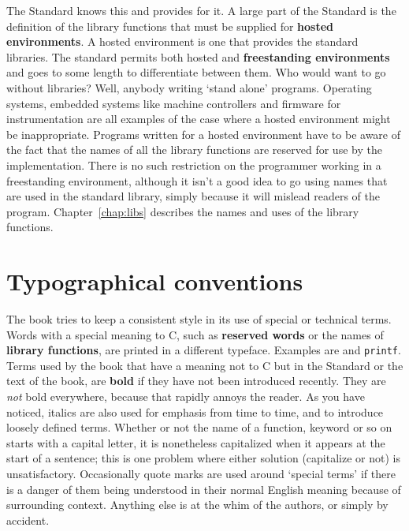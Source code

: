   The Standard knows this and provides for it. A large part of the Standard
   is the definition of the library functions that must be supplied for
   \textbf{hosted environments}. A hosted environment is one that provides
   the standard libraries. The standard permits both hosted and
   \textbf{freestanding environments} and goes to some length to
   differentiate between them. Who would want to go without libraries? Well,
   anybody writing `stand alone' programs. Operating systems, embedded
   systems like machine controllers and firmware for instrumentation are all
   examples of the case where a hosted environment might be inappropriate.
   Programs written for a hosted environment have to be aware of the fact that
   the names of all the library functions are reserved for use by the
   implementation. There is no such restriction on the programmer working in a
   freestanding environment, although it isn't a good idea to go using names
   that are used in the standard library, simply because it will mislead
   readers of the program.
   Chapter~\ref{chap:libs} describes the names and uses
   of the library functions.


 
        \section*{Typographical conventions}
        

  

  The book tries to keep a consistent style in its use of special or
   technical terms. Words with a special meaning to C, such as
   \textbf{reserved words} or the names of \textbf{library functions}, are
   printed in a different typeface. Examples are \kint{} and
   \texttt{printf}. Terms used by the book that have a meaning not to C
   but in the Standard or the text of the book, are \textbf{bold} if they
   have not been introduced recently. They are \textit{not} bold everywhere,
   because that rapidly annoys the reader. As you have noticed, italics are
   also used for emphasis from time to time, and to introduce loosely defined
   terms. Whether or not the name of a function, keyword or so on starts with
   a capital letter, it is nonetheless capitalized when it appears at the
   start of a sentence; this is one problem where either solution (capitalize
   or not) is unsatisfactory. Occasionally quote marks are used around
   `special terms' if there is a danger of them being understood in
   their normal English meaning because of surrounding context. Anything else
   is at the whim of the authors, or simply by accident.


